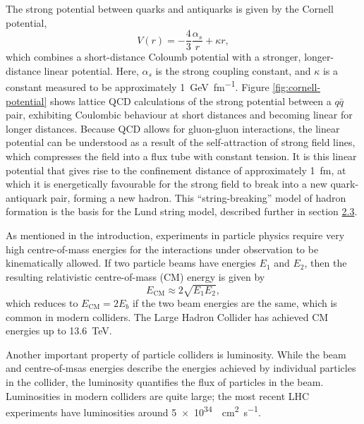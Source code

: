 \documentclass[12pt,a4paper]{report}
\begin{document}
The strong potential between quarks and antiquarks is given by the Cornell potential,
\begin{equation}\label{eq:cornell-potential}
  V(r) = -\frac{4}{3} \frac{\alpha_s}{r} + \kappa r,
\end{equation}
which combines a short-distance Coloumb potential with a stronger, longer-distance linear potential. Here, $\alpha_s$ is the strong coupling constant, and $\kappa$ is a constant measured to be approximately \qty{1}{\giga\electronvolt\per\femto\meter}. Figure \ref{fig:cornell-potential} shows lattice QCD calculations of the strong potential between a $q\bar{q}$ pair, exhibiting Coulombic behaviour at short distances and becoming linear for longer distances. Because QCD allows for gluon-gluon interactions, the linear potential can be understood as a result of the self-attraction of strong field lines, which compresses the field into a flux tube with constant tension. It is this linear potential that gives rise to the confinement distance of approximately \qty{1}{\femto\meter}, at which it is energetically favourable for the strong field to break into a new quark-antiquark pair, forming a new hadron. This ``string-breaking'' model of hadron formation is the basis for the Lund string model, described further in section \hyperref[sec:lsm]{2.3}.

As mentioned in the introduction, experiments in particle physics require very high centre-of-mass energies for the interactions under observation to be kinematically allowed. If two particle beams have energies $E_1$ and $E_2$, then the resulting relativistic centre-of-mass (CM) energy is given by
\begin{equation}
  E_\text{CM} \approx 2 \sqrt{E_1 E_2},
\end{equation}
which reduces to $E_\text{CM}=2E_b$ if the two beam energies are the same, which is common in modern colliders. The Large Hadron Collider has achieved CM energies up to \qty{13.6}{\tera\electronvolt}.

Another important property of particle colliders is luminosity. While the beam and centre-of-msas energies describe the energies achieved by individual particles in the collider, the luminosity quantifies the flux of particles in the beam. Luminosities in modern colliders are quite large; the most recent LHC experiments have luminosities around \qty{5e34}{\per\square\centi\meter\per\second}.
\end{document}
